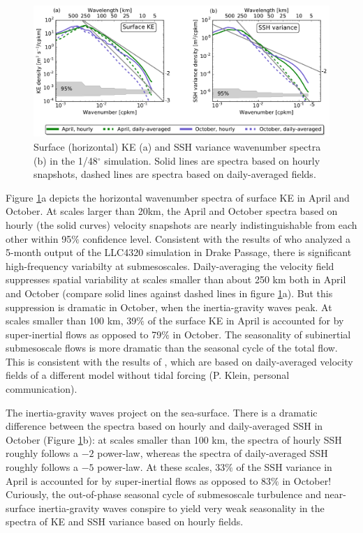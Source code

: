 \documentclass[grl]{agutex2015}
\begin{document}
\begin{article}
\begin{figure}[ht]
  \begin{center}
    \includegraphics[width=.95\textwidth]{figs/fig4.pdf}
 \caption{Surface (horizontal) KE (a) and SSH variance wavenumber spectra (b)
 in the 1/48$^\circ$ simulation. Solid lines
 are spectra based on hourly snapshots, dashed lines are spectra based on daily-averaged
 fields.}
 \label{fig4}
 \end{center}
\end{figure}


Figure \ref{fig4}a depicts the horizontal wavenumber spectra of surface KE in
April and October. At scales larger than 20km, the April and October spectra based on hourly (the solid curves)
velocity snapshots are nearly indistinguishable from each other within 95$\%$ confidence level.
Consistent with the results of
\citet{rocha_etal2016} who analyzed a 5-month output of the LLC4320 simulation in Drake Passage,
there is significant high-frequency variabilty at submesoscales. Daily-averaging
the velocity field suppresses spatial variability at scales smaller than about 250
km both in April and October (compare solid lines against dashed lines in figure
\ref{fig4}a). But this suppression is dramatic in October, when the inertia-gravity waves peak. At scales
smaller than 100 km, 39$\%$ of the surface KE in April is accounted for by super-inertial
flows as opposed to 79$\%$ in October. The seasonality of subinertial submesoscale flows
is more dramatic than the seasonal cycle of the total flow. This is consistent
with the results of \citet{sasaki_etal2014}, which are
based on daily-averaged velocity fields of a different model without tidal forcing
(P. Klein, personal communication).

The inertia-gravity waves project on the sea-surface.
There is a dramatic difference between the spectra
based on hourly and daily-averaged SSH in October (Figure \ref{fig4}b): at scales smaller than 100 km, the spectra
of hourly SSH roughly follows a $-2$ power-law, whereas the spectra of daily-averaged
SSH roughly follows a $-5$ power-law. At these scales, 33$\%$ of the SSH variance in April is accounted for by super-inertial
flows as opposed to 83$\%$ in October! Curiously, the out-of-phase seasonal cycle of submesoscale
turbulence and near-surface inertia-gravity waves conspire to yield very weak seasonality
in the spectra of KE and SSH variance based on hourly fields.



\end{article}
\end{document}
